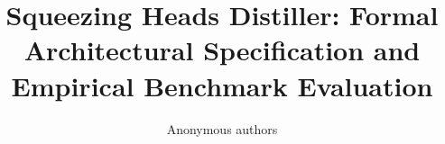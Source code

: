 \title{\textbf{Squeezing Heads Distiller: Formal Architectural Specification and Empirical Benchmark Evaluation}}

\author{Anonymous authors}
